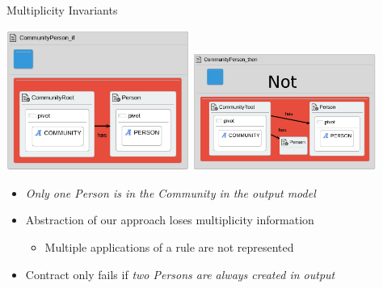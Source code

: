 \documentclass[12pt, handout]{beamer}
\begin{document}
\begin{frame}{Multiplicity Invariants}
\begin{center}
\includegraphics[width=0.45\textwidth]{figures/communityPersonProp_if}
\includegraphics[width=0.45\textwidth]{figures/communityPersonProp_then}
\end{center}
\begin{itemize}
\item \textit{Only one Person is in the Community in the output model}
\end{itemize}
\begin{itemize}
\item Abstraction of our approach loses multiplicity information
\begin{itemize}
\item Multiple applications of a rule are not represented
\end{itemize}
\item Contract only fails if \textit{two Persons are always created in output}
\end{itemize}
\end{frame}
\end{document}

